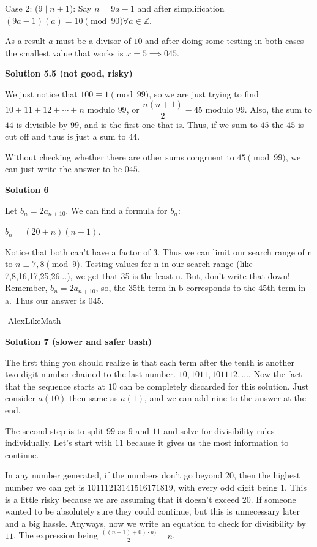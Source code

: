\begin{enumerate}
 Case 2: ($9 \mid n+1$): Say $n=9a-1$ and after simplification $(9a-1)(a) = 10 \pmod{90} \forall a \in \mathbb{Z}$.

 As a result $a$ must be a divisor of $10$ and after doing some testing in both cases the smallest value that works is $x=5 \implies \boxed{045}$.

 



\textbf{Solution 5.5 (not good, risky)}

We just notice that $100 \equiv 1 \pmod{99}$, so we are just trying to find $10 + 11 + 12 + \cdots + n$ modulo $99$, or $\dfrac{n(n+1)}{2} - 45$ modulo $99$. Also, the sum to $44$ is divisible by $99$, and is the first one that is. Thus, if we sum to $45$ the $45$ is cut off and thus is just a sum to $44$.

 Without checking whether there are other sums congruent to $45 \pmod{99}$, we can just write the answer to be $\boxed{045}$.

 



\textbf{Solution 6}

Let $b_n = 2a_{n+10}$. We can find a formula for $b_n$: 

 $b_n = (20+n)(n+1)$. 

 Notice that both can't have a factor of 3. Thus we can limit our search range of n to $n \equiv 7,8 \pmod{9}$. Testing values for n in our search range (like 7,8,16,17,25,26...), we get that 35 is the least n. But, don't write that down! Remember, $b_n = 2a_{n+10}$, so, the 35th term in b corresponds to the 45th term in a. Thus our answer is $\boxed{045}$.

 -AlexLikeMath

 



\textbf{Solution 7 (slower and safer bash)}

The first thing you should realize is that each term after the tenth is another two-digit number chained to the last number. $10, 1011, 101112, \dots$. Now the fact that the sequence starts at $10$ can be completely discarded for this solution. Just consider $a(10)$ then same as $a(1)$, and we can add nine to the answer at the end.

 
The second step is to split $99$ as $9$ and $11$ and solve for divisibility rules individually. Let's start with $11$ because it gives us the most information to continue.

 
In any number generated, if the numbers don't go beyond $20$, then the highest number we can get is $10111213141516171819$, with every odd digit being $1$. This is a little risky because we are assuming that it doesn't exceed $20$. If someone wanted to be absolutely sure they could continue, but this is unnecessary later and a big hassle. Anyways, now we write an equation to check for divisibility by $11$. The expression being $\frac{((n-1) + 0)\cdot n)}{2}-n$.


\end{enumerate}
